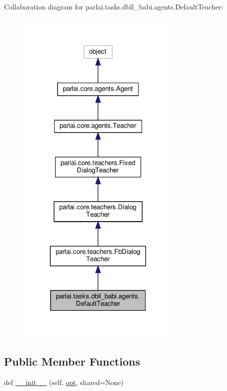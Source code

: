 Collaboration diagram for parlai.\+tasks.\+dbll\+\_\+babi.\+agents.\+Default\+Teacher\+:\nopagebreak
\begin{figure}[H]
\begin{center}
\leavevmode
\includegraphics[width=224pt]{d1/d37/classparlai_1_1tasks_1_1dbll__babi_1_1agents_1_1DefaultTeacher__coll__graph}
\end{center}
\end{figure}
\subsection*{Public Member Functions}
\begin{DoxyCompactItemize}
\item 
def \hyperlink{classparlai_1_1tasks_1_1dbll__babi_1_1agents_1_1DefaultTeacher_ab7d8ee5ef045a12162f79ec74898bca0}{\+\_\+\+\_\+init\+\_\+\+\_\+} (self, \hyperlink{classparlai_1_1core_1_1teachers_1_1FbDialogTeacher_af7a9ec497b9cd0292d7b8fa220da7c28}{opt}, shared=None)
\end{DoxyCompactItemize}
